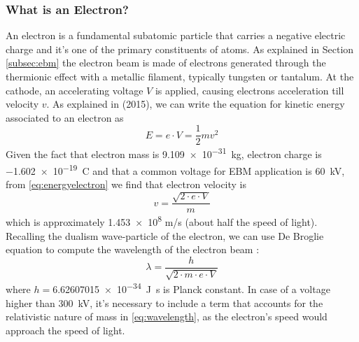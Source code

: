\subsubsection{What is an Electron?}
\label{sssec:electron}
An electron is a fundamental subatomic particle that carries a negative electric charge and it's one of the primary constituents of atoms. As explained in Section \ref{subsec:ebm} the electron beam is made of electrons generated through the thermionic effect with a metallic filament, typically tungsten or tantalum. At the cathode, an accelerating voltage $V$ is applied, causing electrons acceleration till velocity $v$. As explained in \citeauthor{krumeich_properties_2015} (2015), we can write the equation for kinetic energy associated to an electron as 
\begin{equation}
    \label{eq:energyelectron}
    E  = e\cdot V = \frac{1}{2}mv^2
\end{equation}
Given the fact that electron mass is \SI{9.109e-31}{\kilo\gram}, electron charge is \SI{-1.602e-19}{\coulomb} and that a common voltage for EBM application is \SI{60}{\kilo\volt}, from \ref{eq:energyelectron} we find that electron velocity is
\begin{equation}
\label{eq:velocityelectron}
v=\frac{\sqrt{2\cdot e\cdot V}}{m}
\end{equation}
which is approximately \num{1.453e8} \unit{m/s} (about half the speed of light). Recalling the dualism wave-particle of the electron, we can use De Broglie equation to compute the wavelength of the electron beam \cite{krumeich_properties_2015}:
\begin{equation}
\label{eq:wavelength}
    \lambda = \frac{h}{\sqrt{2\cdot m \cdot e \cdot V}}
\end{equation}
where $h=$\SI{6.62607015e-34}{\joule.\second} is Planck constant. In case of a voltage higher than \SI{300}{\kilo\volt}, it's necessary to include a term that accounts for the relativistic nature of mass in \ref{eq:wavelength}, as the electron's speed would approach the speed of light.
